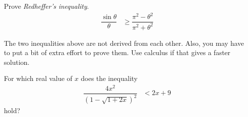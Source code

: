 \documentclass{subfile}
\begin{document}
		\begin{problem}
			Prove \textit{Redheffer's inequality}.
				\begin{align*}
					\dfrac{\sin{\theta}}{\theta}
						& \geq\dfrac{\pi^2-\theta^2}{\pi^2+\theta^2}
				\end{align*}
		\end{problem}
	The two inequalities above are not derived from each other. Also, you may have to put a bit of extra effort to prove them. Use calculus if that gives a faster solution.
		\begin{problem}[IMO $1960$]
			For which real value of $x$ does the inequality
				\begin{align*}
					\dfrac{4x^2}{(1-\sqrt{1+2x})^2}
						& <2x+9
				\end{align*}
			hold?
		\end{problem}
\end{document}
